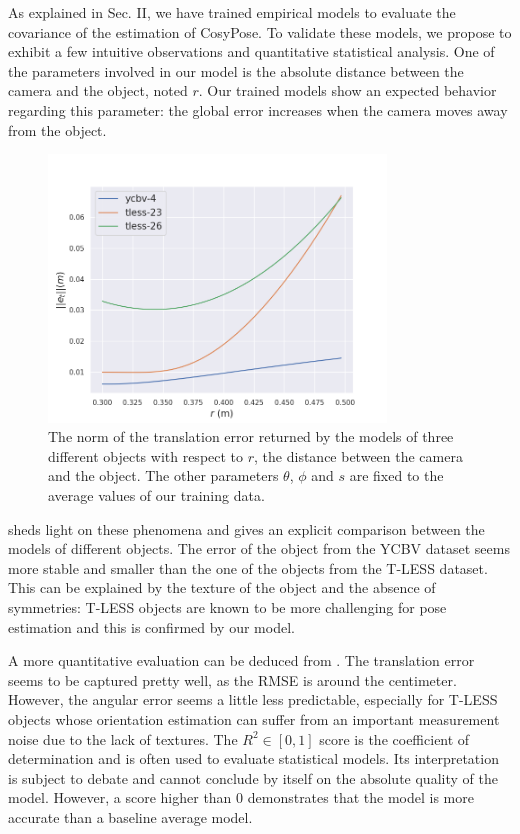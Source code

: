 As explained in Sec. II, we have trained empirical models to evaluate the covariance of the estimation of CosyPose. 
To validate these models, we propose to exhibit a few intuitive observations and quantitative statistical analysis. 
One of the parameters involved in our model is the absolute distance between the camera and the object, noted $r$. 
Our trained models show an expected behavior regarding this parameter: the global error increases when the camera moves away from the object. 
%
\begin{figure}[h]
  \centering 
  \includegraphics[width=0.8\textwidth]{figures/cosyslam/empirical_err.png}
  \caption{The norm of the translation error returned by the models of three different objects with respect to $r$, the distance between the camera and the object. 
            The other parameters $\theta$, $\phi$ and $s$ are fixed to the average values of our training data. }
  \label{fig:empirical_err}
\end{figure}

 sheds light on these phenomena and gives an explicit comparison between the models of different objects. 
The error of the object from the YCBV dataset seems more stable and smaller than the one of the objects from the T-LESS dataset. 
This can be explained by the texture of the object and the absence of symmetries: T-LESS objects are known to be more challenging 
for pose estimation and this is confirmed by our model.

A more quantitative evaluation can be deduced from . The translation error seems to be captured pretty well,
 as the RMSE is around the centimeter. However, the angular error seems a little less predictable, especially for T-LESS objects whose orientation 
 estimation can suffer from an important measurement noise due to the lack of textures. The $R^2\in[0,1]$ score is the coefficient of determination 
 and is often used to evaluate statistical models. Its interpretation is subject to debate and cannot conclude by itself on the absolute quality of the model. 
 However, a score higher than 0 demonstrates that the model is more accurate than a baseline average model.


